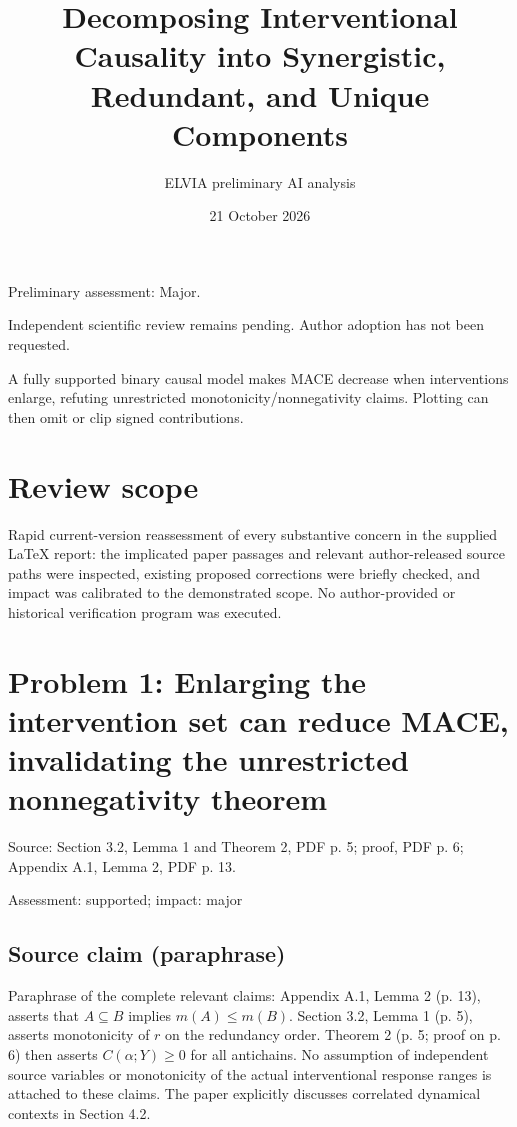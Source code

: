 \documentclass[11pt]{article}
\begin{document}
\title{Decomposing Interventional Causality into Synergistic, Redundant, and Unique Components}

\author{ELVIA preliminary AI analysis}\date{21 October 2026}\maketitle

Preliminary assessment: Major.\par

Independent scientific review remains pending. Author adoption has not been requested.

A fully supported binary causal model makes MACE decrease when interventions enlarge, refuting unrestricted monotonicity/nonnegativity claims. Plotting can then omit or clip signed contributions.

\section*{Review scope}

Rapid current-version reassessment of every substantive concern in the supplied LaTeX report: the implicated paper passages and relevant author-released source paths were inspected, existing proposed corrections were briefly checked, and impact was calibrated to the demonstrated scope. No author-provided or historical verification program was executed.

\section*{Problem 1: Enlarging the intervention set can reduce MACE, invalidating the unrestricted nonnegativity theorem}

Source: Section 3.2, Lemma 1 and Theorem 2, PDF p. 5; proof, PDF p. 6; Appendix A.1, Lemma 2, PDF p. 13.

Assessment: supported; impact: major

\subsection*{Source claim (paraphrase)}

Paraphrase of the complete relevant claims: Appendix A.1, Lemma 2 (p. 13), asserts that \(A\subseteq B\) implies \(m(A)\leq m(B)\). Section 3.2, Lemma 1 (p. 5), asserts monotonicity of \(r\) on the redundancy order. Theorem 2 (p. 5; proof on p. 6) then asserts \(C(\alpha;Y)\geq0\) for all antichains. No assumption of independent source variables or monotonicity of the actual interventional response ranges is attached to these claims. The paper explicitly discusses correlated dynamical contexts in Section 4.2.
\end{document}
